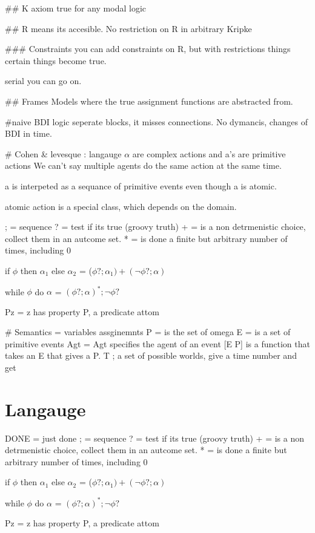 \documentclass{article}
\begin{document}
## K axiom
true for any modal logic

## R
means its accesible. No restriction on R in arbitrary Kripke


### Constraints
you can add constraints on R, but with restrictions things certain
things become true.

serial you can go on.

## Frames
Models where the true assignment functions are abstracted from.

#naive BDI logic
seperate blocks, it misses connections.
No dymancis, changes of BDI in time.

# Cohen & levesque : langauge
$\alpha$ are complex actions and a's are primitive actions
We can't say multiple agents do the same action at the same time.

a is interpeted as a sequance of primitive events even though a is
atomic.

atomic action is a special class, which depends on the domain.

; = sequence
? = test if its true (groovy truth)
+ = is a non detrmenistic choice, collect them in an autcome set.
* = is done a finite but arbitrary number of times, including 0

if $\phi$ then $\alpha_1$ else
$\alpha_2$ = ($\phi? ; \alpha_1) + (\neg \phi?;\alpha)$

while $\phi$ do $\alpha$ = $(\phi?;\alpha)^*;\neg\phi?$

Pz = z has property P, a predicate attom


# Semantics
\omega = variables assginemnts
P = is the set of omega \in \omega
E = is a set of primitive events
Agt = Agt \in [E \to p] specifies the agent of an event [E \to P] is a
function that takes an E that gives a P.
T \subset [Z \to E]; a set of possible worlds, give a time number and get

\section{Langauge}
DONE = just done
; = sequence
? = test if its true (groovy truth)
+ = is a non detrmenistic choice, collect them in an autcome set.
* = is done a finite but arbitrary number of times, including 0

if $\phi$ then $\alpha_1$ else
$\alpha_2$ = ($\phi? ; \alpha_1) + (\neg \phi?;\alpha)$

while $\phi$ do $\alpha$ = $(\phi?;\alpha)^*;\neg\phi?$

Pz = z has property P, a predicate attom
\end{document}
